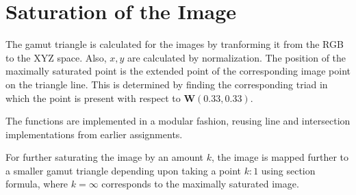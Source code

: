 \documentclass[]{article}
\begin{document}
\section{Saturation of the Image}
The gamut triangle is calculated for the images by tranforming it from the RGB to the XYZ space.
Also, ${x,y}$ are calculated by normalization. The position of the maximally saturated point is the
extended point of the corresponding image point on the triangle line. This is determined by finding
the corresponding triad in which the point is present with respect to $\mathbf{W}(0.33, 0.33)$.

The functions are implemented in a modular fashion, reusing line and intersection implementations
from earlier assignments.

For further saturating the image by an amount $k$, the image is mapped further to a smaller gamut triangle
depending upon taking a point $k:1$ using section formula, where $k=\infty$ corresponds to the maximally
saturated image.
\end{document}
